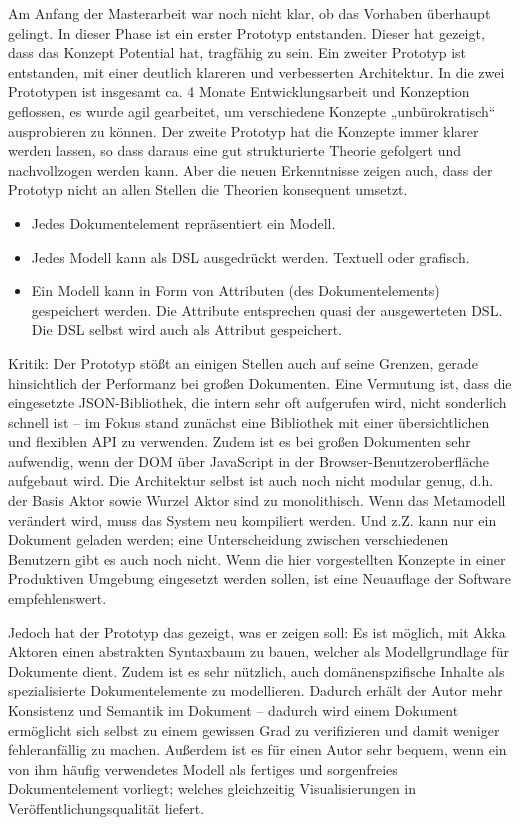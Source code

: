  
Am Anfang der Masterarbeit war noch nicht klar, ob das Vorhaben überhaupt gelingt. In dieser Phase ist ein erster Prototyp entstanden. Dieser hat gezeigt, dass das Konzept Potential hat, tragfähig zu sein. Ein zweiter Prototyp ist entstanden, mit einer deutlich klareren und verbesserten Architektur. In die zwei Prototypen ist insgesamt ca. 4 Monate Entwicklungsarbeit und Konzeption geflossen, es wurde agil gearbeitet, um verschiedene Konzepte „unbürokratisch“ ausprobieren zu können. Der zweite Prototyp hat die Konzepte immer klarer werden lassen, so dass daraus eine gut strukturierte Theorie gefolgert und nachvollzogen werden kann. Aber die neuen Erkenntnisse zeigen auch, dass der Prototyp nicht an allen Stellen die Theorien konsequent umsetzt.

 
\begin{itemize}

\item Jedes Dokumentelement repräsentiert ein Modell.
\item Jedes Modell kann als DSL ausgedrückt werden. Textuell oder grafisch.
\item Ein Modell kann in Form von Attributen (des Dokumentelements) gespeichert werden. Die Attribute entsprechen quasi der ausgewerteten DSL. Die DSL selbst wird auch als Attribut gespeichert.
\end{itemize}
 
Kritik: Der Prototyp stößt an einigen Stellen auch auf seine Grenzen, gerade hinsichtlich der Performanz bei großen Dokumenten. Eine Vermutung ist, dass die eingesetzte JSON-Bibliothek, die intern sehr oft aufgerufen wird, nicht sonderlich schnell ist --  im Fokus stand zunächst eine Bibliothek mit einer übersichtlichen und flexiblen API zu verwenden. Zudem ist es bei großen Dokumenten sehr aufwendig, wenn der DOM über JavaScript in der Browser-Benutzeroberfläche aufgebaut wird. Die Architektur selbst ist auch noch nicht modular genug, d.h. der Basis Aktor sowie Wurzel Aktor sind zu monolithisch. Wenn das Metamodell verändert wird, muss das System neu kompiliert werden. Und z.Z. kann nur ein Dokument geladen werden; eine Unterscheidung zwischen verschiedenen Benutzern gibt es auch noch nicht. Wenn die hier vorgestellten Konzepte in einer Produktiven Umgebung eingesetzt werden sollen, ist eine Neuauflage der Software empfehlenswert.

 
Jedoch hat der Prototyp das gezeigt, was er zeigen soll: Es ist möglich, mit Akka Aktoren einen abstrakten Syntaxbaum zu bauen, welcher als Modellgrundlage für Dokumente dient. Zudem ist es sehr nützlich, auch domänenspzifische Inhalte als spezialisierte Dokumentelemente zu modellieren. Dadurch erhält der Autor mehr Konsistenz und Semantik im Dokument -- dadurch wird einem Dokument ermöglicht sich selbst zu einem gewissen Grad zu verifizieren und damit weniger fehleranfällig zu machen. Außerdem ist es für einen Autor sehr bequem, wenn ein von ihm häufig verwendetes Modell als fertiges und sorgenfreies Dokumentelement vorliegt; welches gleichzeitig Visualisierungen in Veröffentlichungsqualität liefert.


